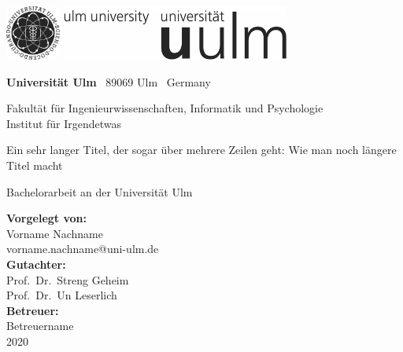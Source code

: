\documentclass[
    a4paper,
    10pt,
    bibliography=totoc,
    twoside,
    openright,
    numbers=noenddot,
    headings=normal,
    DIV=9,
    parskip
]{scrbook}
\makeatletter
\newcommand{\fullname}{Vorname Nachname}
\newcommand{\email}{vorname.nachname@uni-ulm.de}
\newcommand{\titel}{Ein sehr langer Titel, der sogar über mehrere Zeilen geht:
Wie man noch längere Titel macht}
\newcommand{\jahr}{2020}
\newcommand{\gutachterA}{Prof.\ Dr.\ Streng Geheim}
\newcommand{\gutachterB}{Prof.\ Dr.\ Un Leserlich}
\newcommand{\betreuer}{Betreuername}
\newcommand{\fakultaet}{Ingenieurwissenschaften, Informatik und Psychologie}
\newcommand{\institut}{Institut für Irgendetwas}
\newcommand{\arbeit}{Bachelorarbeit}
\makeatother
\begin{document}
\frontmatter


\thispagestyle{empty}
\begin{addmargin*}[4mm]{-32mm}
    \includegraphics[height=1.8cm]{images/unilogo_bild}
    \hfill
    \includegraphics[height=1.8cm]{images/unilogo_wort}
    \vspace*{2.1em}

    \footnotesize
    \textbf{Universität Ulm} \textbar ~89069 Ulm \textbar ~Germany
    \hfill
    \parbox[t]{42mm}{\bfseries \raggedright Fakultät für \fakultaet\\\mdseries\institut}
    \vspace*{2cm}

    \parbox{140mm}{\bfseries \raggedright \huge \titel}

    {\arbeit{} an der Universität Ulm}
    \vspace*{4em}

    \textbf{Vorgelegt von:}\\\fullname\\\email\\[2em]
    \textbf{Gutachter:}\\\gutachterA\\\gutachterB\\[2em]
    \textbf{Betreuer:}\\\betreuer\\[1.5em]
    \jahr
\end{addmargin*}
\end{document}
